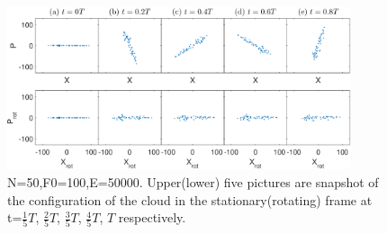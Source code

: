 \documentclass[aps,preprintnumbers,onecolumn,amsmath,amssymb,floatfix,pra]{revtex4-1}
\begin{document}
\begin{figure}[h]
\includegraphics[width=0.9\textwidth]{ZhiyuPictures/stationary_and_rotating_frame_t=1-5_5T.eps}

\caption{N=50,F0=100,E=50000. Upper(lower) five pictures are snapshot of the configuration of the cloud in the stationary(rotating) frame at t=$\frac{1}{5}T$, $\frac{2}{5}T$, $\frac{3}{5}T$, $\frac{4}{5}T$, $T$ respectively.}
\label{fig:Breathingfrequency2_0}
\end{figure}
\end{document}
